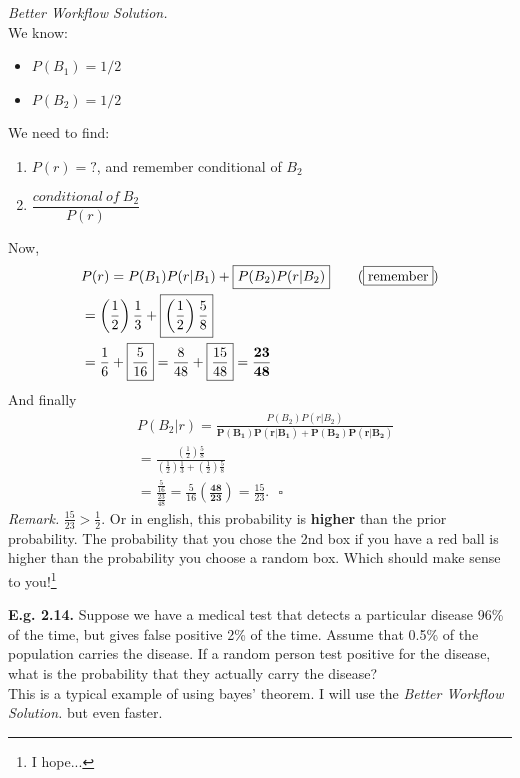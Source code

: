 \documentclass[12pt]{book}
\begin{document}
\noindent \textit{Better Workflow Solution. }\\
We know:
\begin{itemize}
\item $P(B_1)=1/2$
\item $P(B_2)=1/2$
\end{itemize}
We need to find:
\begin{enumerate}
\item $P(r)=?$, and remember conditional of $B_2$
\item $\dfrac{conditional~of~B_2}{P(r)}$
\end{enumerate}
Now,
\begin{align*}
& P(r)=P(B_1)P(r|B_1)+\boxed{P(B_2)P(r|B_2)}   \tag{$\boxed{\text{remember}}$}\\
& = \left( \frac{1}{2} \right) \frac{1}{3} + \boxed{\left( \frac{1}{2} \right) \frac{5}{8}}\\
& = \frac{1}{6} + \boxed{\frac{5}{16}} = \frac{8}{48} + \boxed{\frac{15}{48}} = \mathbf{\frac{23}{48}}
\end{align*}
And finally
\begin{align*}
& P(B_2|r)=\frac{\boxed{P(B_2)P(r|B_2)}}{\mathbf{P(B_1)P(r|B_1)+P(B_2)P(r|B_2)}}   \\
& = \frac{\left( \frac{1}{2} \right) \frac{5}{8}}{ \left( \frac{1}{2} \right) \frac{1}{3} + \left( \frac{1}{2} \right) \frac{5}{8}}\\
& = \frac{\frac{5}{16}}{\frac{23}{48}} = \boxed{\frac{5}{16}}\mathbf{\left(\frac{48}{23}\right)}=\frac{15}{23}.~~~\square
\end{align*}
\textit{Remark. } $\frac{15}{23}>\frac{1}{2}$. Or in english, this probability is \textbf{higher} than the prior probability. The probability that you chose the 2nd box if you have a red ball is higher than the probability you choose a random box. Which should make sense to you!\footnote{I hope...}

\textbf{E.g. 2.14. } Suppose we have a medical test that detects a particular disease 96\% of the time, but gives false positive 2\% of the time. Assume that 0.5\% of the population carries the disease. If a random person test positive for the disease, what is the probability that they actually carry the disease?\\

This is a typical example of using bayes' theorem. I will use the \textit{Better Workflow Solution.} but even faster.\\
\end{document}
